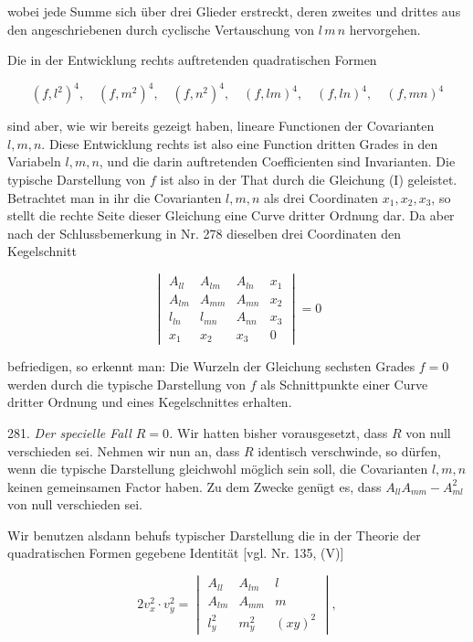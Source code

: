 \documentclass[11pt]{article}
\providecommand{\weberpage}[1]{}
\providecommand{\weq}[2]{\begin{equation}\tag{#1}#2\end{equation}}
\begin{document}
\weberpage{304}
wobei jede Summe sich über drei Glieder erstreckt, deren zweites und drittes aus den angeschriebenen durch cyclische Vertauschung von $l\, m\, n$ hervorgehen.

Die in der Entwicklung rechts auftretenden quadratischen Formen

\[
(f, l^2)^4,\quad (f, m^2)^4,\quad (f, n^2)^4,\quad (f, lm)^4,\quad (f, ln)^4,\quad (f, mn)^4
\]

sind aber, wie wir bereits gezeigt haben, lineare Functionen der Covarianten $l, m, n$. Diese Entwicklung rechts ist also eine Function dritten Grades in den Variabeln $l, m, n$, und die darin auftretenden Coefficienten sind Invarianten. Die typische Darstellung von $f$ ist also in der That durch die Gleichung (I) geleistet. Betrachtet man in ihr die Covarianten $l, m, n$ als drei Coordinaten $x_1, x_2, x_3$, so stellt die rechte Seite dieser Gleichung eine Curve dritter Ordnung dar. Da aber nach der Schlussbemerkung in Nr. 278 dieselben drei Coordinaten den Kegelschnitt

\weq{II}{
\begin{vmatrix}
A_{ll} & A_{lm} & A_{ln} & x_1 \\
A_{lm} & A_{mm} & A_{mn} & x_2 \\
l_{ln} & l_{mn} & A_{nn} & x_3 \\
x_1 & x_2 & x_3 & 0
\end{vmatrix} = 0
}

befriedigen, so erkennt man: Die Wurzeln der Gleichung sechsten Grades $f = 0$ werden durch die typische Darstellung von $f$ als Schnittpunkte einer Curve dritter Ordnung und eines Kegelschnittes erhalten.

281. \textit{Der specielle Fall $R = 0$.} Wir hatten bisher vorausgesetzt, dass $R$ von null verschieden sei. Nehmen wir nun an, dass $R$ identisch verschwinde, so dürfen, wenn die typische Darstellung gleichwohl möglich sein soll, die Covarianten $l, m, n$ keinen gemeinsamen Factor haben. Zu dem Zwecke genügt es, dass $A_{ll}A_{mm} - A_{ml}^2$ von null verschieden sei.

Wir benutzen alsdann behufs typischer Darstellung die in der Theorie der quadratischen Formen gegebene Identität [vgl. Nr. 135, (V)]

\[
2v_x^2 \cdot v_y^2 =
\begin{vmatrix}
A_{ll} & A_{lm} & l \\
A_{lm} & A_{mm} & m \\
l_y^2 & m_y^2 & (xy)^2
\end{vmatrix},
\]
\end{document}
